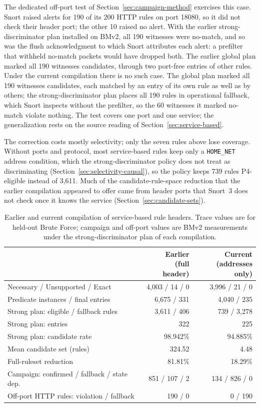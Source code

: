 \documentclass{article}
\begin{document}
The dedicated off-port test of Section~\ref{sec:campaign-method} exercises
this case. Snort raised alerts for 190 of its 200 HTTP rules on port 18080,
so it did not check their header port; the other 10 raised no alert. With the earlier strong-discriminator plan installed on BMv2, all 190
witnesses were no-match, and so was the flush acknowledgment to which Snort
attributes each alert: a prefilter that withheld no-match packets would have
dropped both. The earlier global plan marked all 190 witnesses candidates,
through two port-free entries of other rules. Under the current compilation
there is no such case. The global plan marked all 190 witnesses candidates,
each matched by an entry of its own rule as well as by others; the
strong-discriminator plan places all 190 rules in operational fallback, which
Snort inspects without the prefilter, so the 60 witnesses it marked no-match
violate nothing. The test covers one port and one service; the
generalization rests on the source reading of
Section~\ref{sec:service-based}.

The correction costs mostly selectivity; only the seven rules above lose
coverage. Without ports and
protocol, most service-based rules keep only a \texttt{HOME\_NET} address
condition, which the strong-discriminator policy does not treat as
discriminating (Section~\ref{sec:selectivity-causal}), so the policy keeps
739 rules P4-eligible instead of 3,611. Much of the candidate-rule-space
reduction that the earlier compilation appeared to offer came from header
ports that Snort~3 does not check once it knows the service
(Section~\ref{sec:candidate-sets}).

\begin{table}[t]
\centering
\footnotesize
\setlength{\tabcolsep}{4pt}
\caption{Earlier and current compilation of service-based rule headers.
Trace values are for held-out Brute Force; campaign and off-port values are
BMv2 measurements under the strong-discriminator plan of each compilation.}
\label{tab:compilations}
\begin{tabular}{lrr}
\toprule
 & \shortstack{Earlier\\(full header)} & \shortstack{Current\\(addresses only)} \\
\midrule
Necessary / Unsupported / Exact & 4,003 / 14 / 0 & 3,996 / 21 / 0 \\
Predicate instances / final entries & 6,675 / 331 & 4,040 / 235 \\
Strong plan: eligible / fallback rules & 3,611 / 406 & 739 / 3,278 \\
Strong plan: entries & 322 & 225 \\
Strong plan: candidate rate & 98.942\% & 94.885\% \\
Mean candidate set (rules) & 324.52 & 4.48 \\
Full-ruleset reduction & 81.81\% & 18.29\% \\
Campaign: confirmed / fallback / state dep. & 851 / 107 / 2 & 134 / 826 / 0 \\
Off-port HTTP rules: violation / fallback & 190 / 0 & 0 / 190 \\
\bottomrule
\end{tabular}
\end{table}
\end{document}
